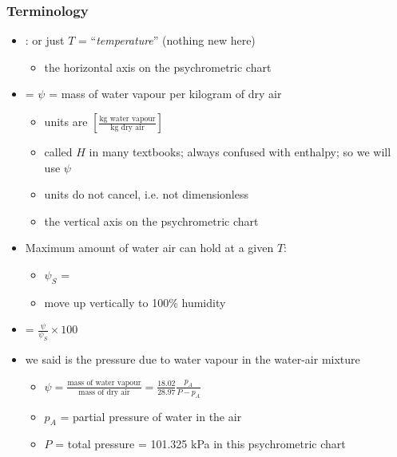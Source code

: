 \begin{frame}\frametitle{Terminology}
	\begin{itemize}
		\item	{\color{purple}{Dry bulb temperature}}: or just $T$ = ``\emph{temperature}'' {\tiny (nothing new here)}
		\begin{itemize}
			\item	the horizontal axis on the psychrometric chart
		\end{itemize}
		\item	{\color{purple}{Humidity}} = $\psi$ = mass of water vapour per kilogram of dry air
		\begin{itemize}
			\item	units are $ \left[ \displaystyle \frac{\text{kg water vapour}}{\text{kg dry air}}\right]$ 
			\item	called $H$ in many textbooks; always confused with enthalpy; so we will use $\psi$
			\item	units do not cancel, i.e. not dimensionless
			\item	the vertical axis on the psychrometric chart
		\end{itemize}
		\item	Maximum amount of water air can hold at a given $T$:
			\begin{itemize}
				\item	$\psi_S$ = {\color{purple}{saturation humidity}}
				\item	move up vertically to 100\% humidity
			\end{itemize}
		\item	{\color{purple}{Percentage humidity}} = $\displaystyle \frac{\psi}{\psi_S}\times 100$	
		\vspace{4pt}
		\item	{\color{purple}{Partial pressure}} we said is the pressure due to water vapour in the water-air mixture
		\vspace{4pt}
		\begin{itemize}
			\item	$\psi = \displaystyle \frac{\text{mass of water vapour}}{\text{mass of dry air}} = \displaystyle \frac{18.02}{28.97}\frac{p_A}{P-p_A}$
			\item	$p_A$ = partial pressure of water in the air
			\item	$P$ = total pressure = 101.325 kPa in this psychrometric chart
		\end{itemize}
	\end{itemize}
\end{frame}

